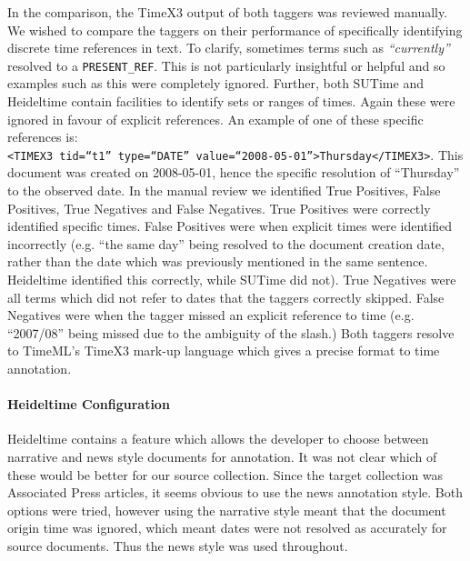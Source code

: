 \documentclass{mprop}
\newcommand{\code}[1]{\texttt{#1}}
\let\oldcite=\cite
\renewcommand\cite[1]{\ifthenelse{\equal{#1}{NEEDED}}{\ensuremath{^\texttt{[citation~needed]}}}{\oldcite{#1}}}
\begin{document}
In the comparison, the TimeX3 output of both taggers was reviewed manually. We wished to compare the taggers on their performance of specifically identifying discrete time references in text. To clarify, sometimes terms such as \textit{``currently''} resolved to a \code{PRESENT\_REF}. This is not particularly insightful or helpful and so examples such as this were completely ignored. Further, both SUTime and Heideltime contain facilities to identify sets or ranges of times. Again these were ignored in favour of explicit references. An example of one of these specific references is: 
\\ \code{<TIMEX3 tid=``t1'' type=``DATE'' value=``2008-05-01''>Thursday</TIMEX3>}.
This document was created on 2008-05-01, hence the specific resolution of ``Thursday'' to the observed date.
In the manual review we identified True Positives, False Positives, True Negatives and False Negatives. True Positives were correctly identified specific times. False Positives were when explicit times were identified incorrectly (e.g. ``the same day'' being resolved to the document creation date, rather than the date which was previously mentioned in the same sentence. Heideltime identified this correctly, while SUTime did not). True Negatives were all terms which did not refer to dates that the taggers correctly skipped. False Negatives were when the tagger missed an explicit reference to time (e.g. ``2007/08'' being missed due to the ambiguity of the slash.)
Both taggers resolve to TimeML's TimeX3\cite{timeml} mark-up language which gives a precise format to time annotation.

\paragraph{Heideltime Configuration}
Heideltime contains a feature which allows the developer to choose between narrative and news style documents for annotation. It was not clear which of these would be better for our source collection. Since the target collection was Associated Press articles, it seems obvious to use the news annotation style. Both options were tried, however using the narrative style meant that the document origin time was ignored, which meant dates were not resolved as accurately for source documents. Thus the news style was used throughout.
\end{document}
